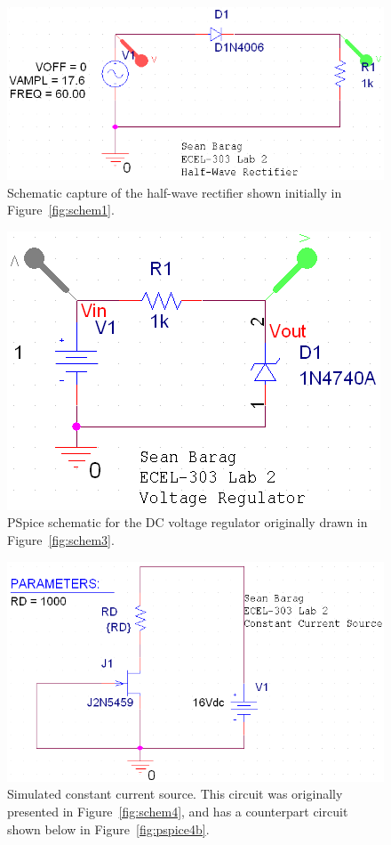 \begin{figure}[H]
	\centering
	\includegraphics[width=.6\textwidth]{img/screen/halfwaveShot.PNG}
	\parbox{.6\textwidth}{
	\caption{Schematic capture of the half-wave rectifier shown initially in
		Figure~\ref{fig:schem1}.}
	\label{fig:pspice1}}
\end{figure}

\begin{figure}[H]
	\centering
	\includegraphics[width=.6\textwidth]{img/screen/voltageRegulatorShot.PNG}
	\parbox{.6\textwidth}{
	\caption{PSpice schematic for the DC voltage regulator originally drawn in
		Figure~\ref{fig:schem3}.}
	\label{fig:pspice3}}
\end{figure}

\begin{figure}[H]
	\centering
	\includegraphics[width=.6\textwidth]{img/screen/constantCurrent16Shot.PNG}
	\parbox{.6\textwidth}{
	\caption{Simulated constant current source.  This circuit was originally
		presented in Figure~\ref{fig:schem4}, and has a counterpart circuit shown
		below in Figure~\ref{fig:pspice4b}.}
	\label{fig:pspice4a}}
\end{figure}

